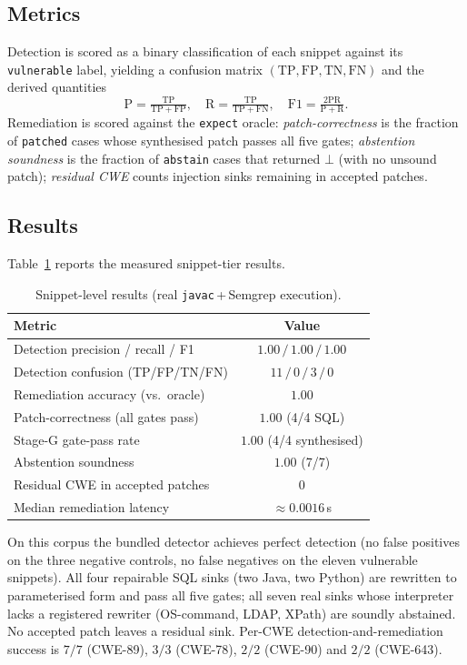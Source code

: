 \documentclass[11pt,a4paper]{article}
\newcommand{\bottom}{\ensuremath{\bot}}
\newcommand{\code}[1]{\texttt{\small #1}}
\begin{document}
\subsection{Metrics}
Detection is scored as a binary classification of each snippet against its
\code{vulnerable} label, yielding a confusion matrix
$(\mathrm{TP},\mathrm{FP},\mathrm{TN},\mathrm{FN})$ and the derived
quantities
\[
  \mathrm{P}=\tfrac{\mathrm{TP}}{\mathrm{TP}+\mathrm{FP}},\quad
  \mathrm{R}=\tfrac{\mathrm{TP}}{\mathrm{TP}+\mathrm{FN}},\quad
  \mathrm{F1}=\tfrac{2\mathrm{PR}}{\mathrm{P}+\mathrm{R}} .
\]
Remediation is scored against the \code{expect} oracle:
\emph{patch-correctness} is the fraction of \code{patched} cases whose
synthesised patch passes all five gates; \emph{abstention soundness} is
the fraction of \code{abstain} cases that returned \bottom{} (with no
unsound patch); \emph{residual CWE} counts injection sinks remaining in
accepted patches.

\subsection{Results}
Table~\ref{tab:snippet-results} reports the measured snippet-tier results.

\begin{table}[h]
\centering
\caption{Snippet-level results (real \code{javac}\,+\,Semgrep execution).}
\label{tab:snippet-results}
\begin{tabular}{@{}lc@{}}
\toprule
\textbf{Metric} & \textbf{Value} \\
\midrule
Detection precision / recall / F1   & $1.00\,/\,1.00\,/\,1.00$ \\
Detection confusion (TP/FP/TN/FN)   & $11\,/\,0\,/\,3\,/\,0$ \\
Remediation accuracy (vs.\ oracle)  & $1.00$ \\
Patch-correctness (all gates pass)  & $1.00$ (4/4 SQL) \\
Stage-G gate-pass rate              & $1.00$ (4/4 synthesised) \\
Abstention soundness                & $1.00$ (7/7) \\
Residual CWE in accepted patches    & $0$ \\
Median remediation latency          & $\approx 0.0016$\,s \\
\bottomrule
\end{tabular}
\end{table}

On this corpus the bundled detector achieves perfect detection (no false
positives on the three negative controls, no false negatives on the eleven
vulnerable snippets). All four repairable SQL sinks (two Java, two Python)
are rewritten to parameterised form and pass all five gates; all seven
real sinks whose interpreter lacks a registered rewriter
(OS-command, LDAP, XPath) are soundly abstained. No accepted patch leaves
a residual sink. Per-CWE detection-and-remediation success is
$7/7$ (CWE-89), $3/3$ (CWE-78), $2/2$ (CWE-90) and $2/2$ (CWE-643).
\end{document}

